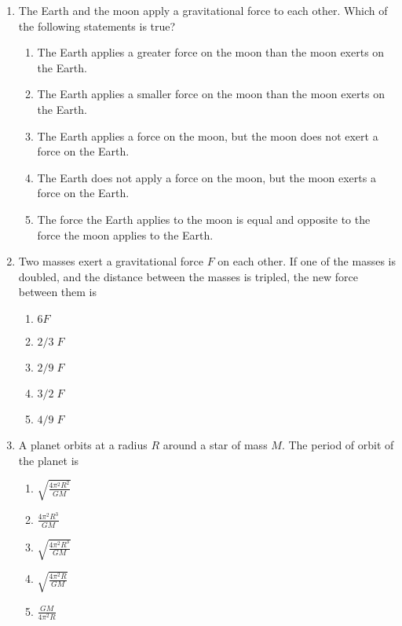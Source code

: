 \documentclass[12pt]{article}
\begin{document}
\begin{enumerate}[leftmargin=50pt,label=\underline{\hspace{0.4in}} \arabic*.]
\item The Earth and the moon apply a gravitational force to each other.
  Which of the following statements is true?
  \begin{enumerate}[noitemsep,topsep=0pt,leftmargin=18pt]  
  \item The Earth applies a greater force on the moon than the moon exerts on
    the Earth.
  \item The Earth applies a smaller force on the moon than the moon exerts on
    the Earth.
  \item The Earth applies a force on the moon, but the moon does not exert a
    force on the Earth.
  \item The Earth does not apply a force on the moon, but the moon exerts a
    force on the Earth.
  \item The force the Earth applies to the moon is equal and opposite to the
    force the moon applies to the Earth.
  \end{enumerate}
  \newpage
  
\item Two masses exert a gravitational force $F$ on each other. If one of the
  masses is doubled, and the distance between the masses is tripled, the
  new force between them is
  \begin{enumerate}[noitemsep,topsep=0pt,leftmargin=18pt]  
  \item $6F$
  \item $2/3\;F$
  \item $2/9\;F$
  \item $3/2\;F$
  \item $4/9\;F$
  \end{enumerate}

\item A planet orbits at a radius $R$ around a star of mass $M$. The period of
  orbit of the planet is
  \begin{enumerate}[noitemsep,topsep=0pt,leftmargin=18pt]  
  \item$\displaystyle\sqrt{\frac{4\pi^2R^2}{GM}}$
  \item$\displaystyle\frac{4\pi^2R^3}{GM}$
  \item$\displaystyle\sqrt{\frac{4\pi^2R^3}{GM}}$
  \item$\displaystyle\sqrt{\frac{4\pi^2R}{GM}}$
  \item$\displaystyle\frac{GM}{4\pi^2R}$
  \end{enumerate}
  

\end{enumerate}
\end{document}
